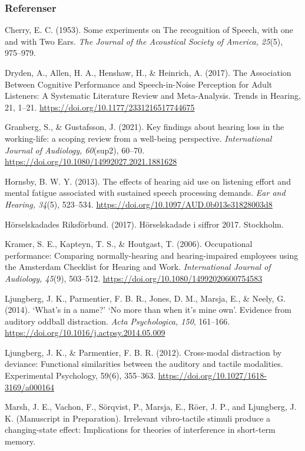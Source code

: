\documentclass[]{article}
\begin{document}
\hypertarget{referenser}{%
\subsubsection{Referenser}\label{referenser}}

Cherry, E. C. (1953). Some experiments on The recognition of Speech,
with one and with Two Ears. \emph{The Journal of the Acoustical Society
of America, 25}(5), 975--979.

Dryden, A., Allen, H. A., Henshaw, H., \& Heinrich, A. (2017). The
Association Between Cognitive Performance and Speech-in-Noise Perception
for Adult Listeners: A Systematic Literature Review and Meta-Analysis.
Trends in Hearing, 21, 1--21.
\url{https://doi.org/10.1177/2331216517744675}

Granberg, S., \& Gustafsson, J. (2021). Key findings about hearing loss
in the working-life: a scoping review from a well-being perspective.
\emph{International Journal of Audiology, 60}(sup2), 60--70.
\url{https://doi.org/10.1080/14992027.2021.1881628}

Hornsby, B. W. Y. (2013). The effects of hearing aid use on listening
effort and mental fatigue associated with sustained speech processing
demands. \emph{Ear and Hearing, 34}(5), 523--534.
\url{https://doi.org/10.1097/AUD.0b013e31828003d8}

Hörselskadades Riksförbund. (2017). Hörselskadade i siffror 2017.
Stockholm.

Kramer, S. E., Kapteyn, T. S., \& Houtgast, T. (2006). Occupational
performance: Comparing normally-hearing and hearing-impaired employees
using the Amsterdam Checklist for Hearing and Work. \emph{International
Journal of Audiology, 45}(9), 503--512.
\url{https://doi.org/10.1080/14992020600754583}

Ljungberg, J. K., Parmentier, F. B. R., Jones, D. M., Marsja, E., \&
Neely, G. (2014). `What's in a name?' `No more than when it's mine own'.
Evidence from auditory oddball distraction. \emph{Acta Psychologica,
150}, 161--166. \url{https://doi.org/10.1016/j.actpsy.2014.05.009}

Ljungberg, J. K., \& Parmentier, F. B. R. (2012). Cross-modal
distraction by deviance: Functional similarities between the auditory
and tactile modalities. Experimental Psychology, 59(6), 355--363.
\url{https://doi.org/10.1027/1618-3169/a000164}

Marsh, J. E., Vachon, F., Sörqvist, P., Marsja, E., Röer, J. P., and
Ljungberg, J. K. (Manuscript in Preparation). Irrelevant vibro-tactile
stimuli produce a changing-state effect: Implications for theories of
interference in short-term memory.
\end{document}
